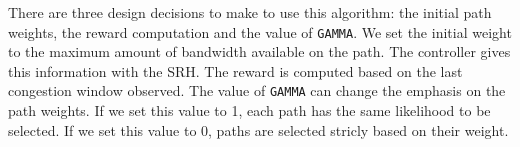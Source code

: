 There are three design decisions to make to use this algorithm: the initial path weights, the reward computation and the value of \texttt{GAMMA}.
We set the initial weight to the maximum amount of bandwidth available on the path.
The controller gives this information with the SRH.
The reward is computed based on the last congestion window observed.
The value of \texttt{GAMMA} can change the emphasis on the path weights.
If we set this value to 1, each path has the same likelihood to be selected.
If we set this value to 0, paths are selected stricly based on their weight.



